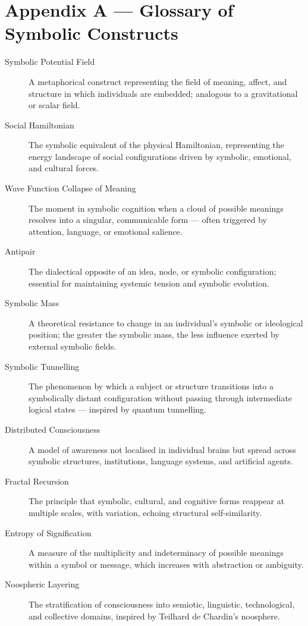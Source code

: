 \section*{Appendix A — Glossary of Symbolic Constructs}

\begin{description}
  \item[Symbolic Potential Field] A metaphorical construct representing the field of meaning, affect, and structure in which individuals are embedded; analogous to a gravitational or scalar field.

  \item[Social Hamiltonian] The symbolic equivalent of the physical Hamiltonian, representing the energy landscape of social configurations driven by symbolic, emotional, and cultural forces.

  \item[Wave Function Collapse of Meaning] The moment in symbolic cognition when a cloud of possible meanings resolves into a singular, communicable form — often triggered by attention, language, or emotional salience.

  \item[Antipair] The dialectical opposite of an idea, node, or symbolic configuration; essential for maintaining systemic tension and symbolic evolution.

  \item[Symbolic Mass] A theoretical resistance to change in an individual's symbolic or ideological position; the greater the symbolic mass, the less influence exerted by external symbolic fields.

  \item[Symbolic Tunnelling] The phenomenon by which a subject or structure transitions into a symbolically distant configuration without passing through intermediate logical states — inspired by quantum tunnelling.

  \item[Distributed Consciousness] A model of awareness not localised in individual brains but spread across symbolic structures, institutions, language systems, and artificial agents.

  \item[Fractal Recursion] The principle that symbolic, cultural, and cognitive forms reappear at multiple scales, with variation, echoing structural self-similarity.

  \item[Entropy of Signification] A measure of the multiplicity and indeterminacy of possible meanings within a symbol or message, which increases with abstraction or ambiguity.

  \item[Noospheric Layering] The stratification of consciousness into semiotic, linguistic, technological, and collective domains, inspired by Teilhard de Chardin's noosphere.
\end{description}
